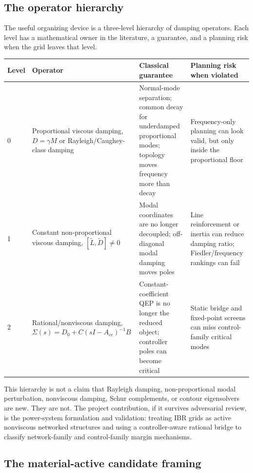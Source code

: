 \documentclass[11pt]{article}
\newcommand{\Lt}{\widetilde L}
\newcommand{\Dt}{\widetilde D}
\begin{document}
\subsection{The operator hierarchy}

The useful organizing device is a three-level hierarchy of damping operators.
Each level has a mathematical owner in the literature, a guarantee, and a
planning risk when the grid leaves that level.

\begin{center}
\renewcommand{\arraystretch}{1.25}
\begin{tabular}{p{}p{}p{}p{}}
\toprule
Level & Operator & Classical guarantee & Planning risk when violated\\
\midrule
0 & Proportional viscous damping, $D=\gamma M$ or Rayleigh/Caughey-class damping
& Normal-mode separation; common decay for underdamped proportional modes; topology moves frequency more than decay
& Frequency-only planning can look valid, but only inside the proportional floor\\
1 & Constant non-proportional viscous damping, $[\Lt,\Dt]\neq0$
& Modal coordinates are no longer decoupled; off-diagonal modal damping moves poles
& Line reinforcement or inertia can reduce damping ratio; Fiedler/frequency rankings can fail\\
2 & Rational/nonviscous damping, $\Sigma(s)=D_0+C(sI-A_{cc})^{-1}B$
& Constant-coefficient QEP is no longer the reduced object; controller poles can become critical
& Static bridge and fixed-point screens can miss control-family critical modes\\
\bottomrule
\end{tabular}
\end{center}

This hierarchy is not a claim that Rayleigh damping, non-proportional modal
perturbation, nonviscous damping, Schur complements, or contour eigensolvers are
new. They are not. The project contribution, if it survives adversarial review,
is the power-system formulation and validation: treating IBR grids as active
nonviscous networked structures and using a controller-aware rational bridge to
classify network-family and control-family margin mechanisms.

\subsection{The material-active candidate framing}
\end{document}
